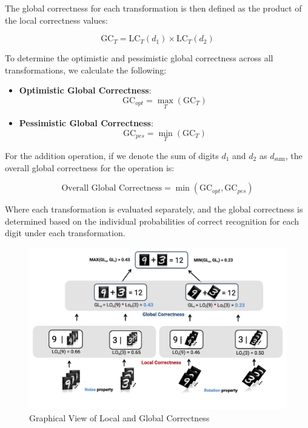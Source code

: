 \documentclass[10pt, conference, a4paper, final]{IEEEtran}
\begin{document}
    The global correctness for each transformation is then defined as the product of the local correctness values:
    
    \[
    \text{GC}_{T} = \text{LC}_{T}(d_1) \times \text{LC}_{T}(d_2)
    \]
    
    To determine the optimistic and pessimistic global correctness across all transformations, we calculate the following:
    
    \begin{itemize}
        \item \textbf{Optimistic Global Correctness}:
        \[
        \text{GC}_{opt} = \max_{T} (\text{GC}_{T})
        \]
        \item \textbf{Pessimistic Global Correctness}:
        \[
        \text{GC}_{pes} = \min_{T} (\text{GC}_{T})
        \]
    \end{itemize}
    
    For the addition operation, if we denote the sum of digits \( d_1 \) and \( d_2 \) as \( d_{\text{sum}} \), the overall global correctness for the operation is:
    
    \[
    \text{Overall Global Correctness} = \min(\text{GC}_{opt}, \text{GC}_{pes})
    \]
    
    Where each transformation is evaluated separately, and the global correctness is determined based on the individual probabilities of correct recognition for each digit under each transformation.
    \begin{figure}{}
        \centering
        \includegraphics[width=\linewidth]{paper_images/noise_rotation_localcal_global.pdf}
        \caption{Graphical View of Local and Global Correctness}
        \label{fig:graph}
    \end{figure}
\end{document}
